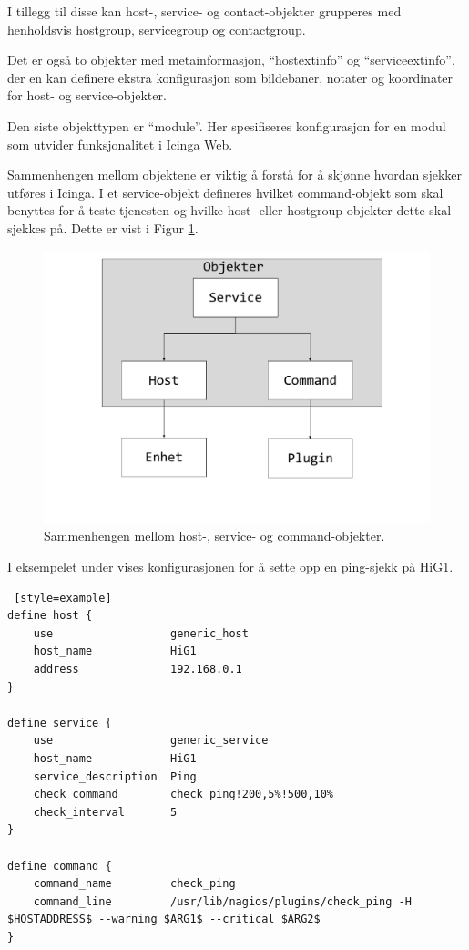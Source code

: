 I tillegg til disse kan host-, service- og contact-objekter grupperes med henholdsvis hostgroup, servicegroup og contactgroup.

Det er også to objekter med metainformasjon, ``hostextinfo'' og ``serviceextinfo'', der en kan definere ekstra konfigurasjon som bildebaner, notater og koordinater for host- og service-objekter.

Den siste objekttypen er ``module''. Her spesifiseres konfigurasjon for en modul som utvider funksjonalitet i Icinga Web.

Sammenhengen mellom objektene er viktig å forstå for å skjønne hvordan sjekker utføres i Icinga. I et service-objekt defineres hvilket command-objekt som skal benyttes for å teste tjenesten og hvilke host- eller hostgroup-objekter dette skal sjekkes på. Dette er vist i Figur \ref{command_host_service}.

\begin{figure}[H]
    \centering
    \includegraphics[scale=0.4]{img/command_host_service}
    \caption{Sammenhengen mellom host-, service- og command-objekter.}
    \label{command_host_service}
\end{figure}
I eksempelet under vises konfigurasjonen for å sette opp en ping-sjekk på HiG1.
\begin{lstlisting} [style=example]
define host {
    use                  generic_host
    host_name            HiG1
    address              192.168.0.1
}

define service {
    use	                 generic_service
    host_name            HiG1
    service_description  Ping
    check_command        check_ping!200,5%!500,10%
    check_interval       5
}

define command {
    command_name         check_ping
    command_line         /usr/lib/nagios/plugins/check_ping -H $HOSTADDRESS$ --warning $ARG1$ --critical $ARG2$   
}
\end{lstlisting}


